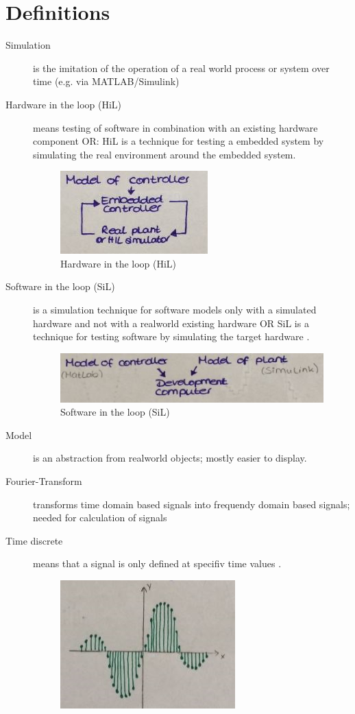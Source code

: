 \section{Definitions}
\begin{description}
	\item[Simulation] is the imitation of the operation of a real world process or system over time (e.g. via MATLAB/Simulink)
	\item[Hardware in the loop (HiL)] means testing of software in combination with an existing hardware component OR: HiL is a technique for testing a embedded system by simulating the real environment around the embedded system. 
		\begin{figure}[!h]
		\centering
			\includegraphics[width=0.4\linewidth]{images/HiL}
			\caption{Hardware in the loop (HiL)}
			\label{fig:HiL}
		\end{figure}
	\item[Software in the loop (SiL)] is a simulation technique for software models only with a simulated hardware and not with a realworld existing hardware OR SiL is a technique for testing software by simulating the target hardware .
		\begin{figure}[!h]
			\centering
			\includegraphics[width=0.7\linewidth]{images/SiL}
			\caption{Software in the loop (SiL)}
			\label{fig:SiL}
		\end{figure}
	\item[Model] is an abstraction from realworld objects; mostly easier to display.
	\item[Fourier-Transform] transforms time domain based signals into frequendy domain based signals; needed for calculation of signals
	\item[Time discrete] means that a signal is only defined at specifiv time values .
		\begin{figure}[!h]
			\centering
			\includegraphics[width=0.5\linewidth]{images/timediscrete}

\end{figure}
\end{description}

